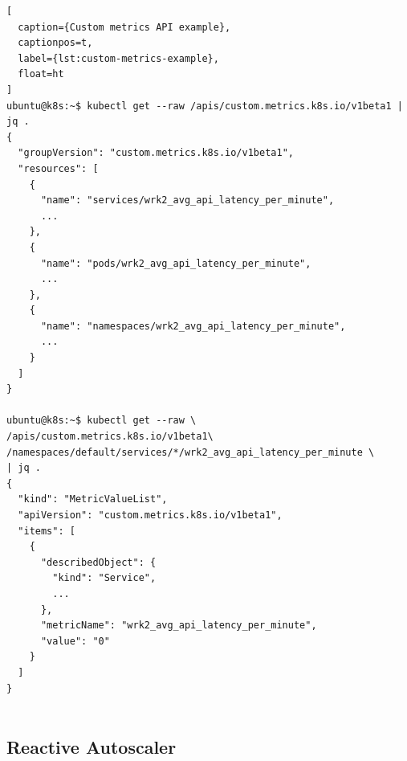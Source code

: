 \begin{lstlisting}[
  caption={Custom metrics API example},
  captionpos=t,
  label={lst:custom-metrics-example},
  float=ht
]
ubuntu@k8s:~$ kubectl get --raw /apis/custom.metrics.k8s.io/v1beta1 | jq .
{
  "groupVersion": "custom.metrics.k8s.io/v1beta1",
  "resources": [
    {
      "name": "services/wrk2_avg_api_latency_per_minute",
      ...
    },
    {
      "name": "pods/wrk2_avg_api_latency_per_minute",
      ...
    },
    {
      "name": "namespaces/wrk2_avg_api_latency_per_minute",
      ...
    }
  ]
}

ubuntu@k8s:~$ kubectl get --raw \
/apis/custom.metrics.k8s.io/v1beta1\
/namespaces/default/services/*/wrk2_avg_api_latency_per_minute \
| jq .
{
  "kind": "MetricValueList",
  "apiVersion": "custom.metrics.k8s.io/v1beta1",
  "items": [
    {
      "describedObject": {
        "kind": "Service",
        ...
      },
      "metricName": "wrk2_avg_api_latency_per_minute",
      "value": "0"
    }
  ]
}


\end{lstlisting}

\subsection{Reactive Autoscaler}
\label{subsec:reactive-auto-subsection}

